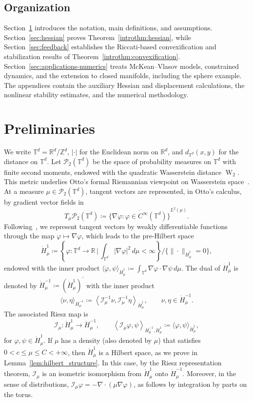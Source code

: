\documentclass[11pt]{article}
\numberwithin{equation}{section}
\theoremstyle{definition}
\newcommand{\R}{\mathbb{R}}
\newcommand{\T}{\mathbb{T}}
\newcommand{\Pcal}{\mathcal{P}}
\newcommand{\Wtwo}{\operatorname{W}_2}
\newcommand{\potential}[1][\mu]{\dot{H}^1_{#1}}
\newcommand{\dualspace}[1][\mu]{\dot{H}^{-1}_{#1}}
\newcommand{\rieszmap}[1][\mu]{\mathcal{I}_{#1}}
\begin{document}
\subsection{Organization}

Section~\ref{sec:setting} introduces the notation, main definitions, and assumptions.
Section~\ref{sec:hessian} proves Theorem~\ref{introthm:hessian}, while Section~\ref{sec:feedback} establishes the Riccati-based convexification and stabilization results of Theorem~\ref{introthm:convexification}.
Section~\ref{sec:applications-numerics} treats McKean--Vlasov models, constrained dynamics, and the extension to closed manifolds, including the sphere example.
The appendices contain the auxiliary Hessian and displacement calculations, the nonlinear stability estimates, and the numerical methodology.

\section{Preliminaries}
\label{sec:setting}

We write $\T^d = \R^d/\mathbb{Z}^d$, $|\cdot|$ for the Euclidean norm on $\R^d$, and $d_{\T^d}(x,y)$ for the distance on $\T^d$.
Let $\Pcal_2(\T^d)$ be the space of probability measures on $\T^d$ with finite second moments, endowed with the quadratic Wasserstein distance $\Wtwo$.
This metric underlies Otto's formal Riemannian viewpoint on Wasserstein space~\cite{Otto2001,AmbrosioGigliSavare2008}.
At a measure $\mu \in \Pcal_2(\T^d)$, tangent vectors are represented, in Otto's calculus, by gradient vector fields in
\[
T_\mu\Pcal_2(\T^d) \coloneqq \overline{\{\nabla\varphi : \varphi\in C^\infty(\T^d)\}}^{L^2(\mu)}.
\]
Following~\cite{denzler2005fast}, we represent tangent vectors by weakly differentiable functions through the map $\varphi \mapsto \nabla\varphi$, which leads to the pre-Hilbert space
\[
\potential \coloneqq \left\{ \varphi : \T^d \to \R \, \Big| \, \int_{\T^d} |\nabla\varphi|^2 \, d\mu < \infty\right\} \big/ \{\|\cdot\|_{\potential} = 0\},
\]
endowed with the inner product $\langle \varphi, \psi \rangle_{\potential} \coloneqq \int_{\T^d} \nabla\varphi \cdot \nabla\psi \, d\mu$.
The dual of $\potential$ is denoted by $\dualspace \coloneqq (\potential)^\prime$ with the inner product
\[
\langle \nu, \eta \rangle_{\dualspace} \coloneqq \left\langle \rieszmap[\mu]^{-1}\nu, \rieszmap[\mu]^{-1}\eta \right\rangle_{\potential}, \qquad \nu, \eta \in \dualspace.
\]
The associated Riesz map is
\[
\rieszmap : \potential \to \dualspace, \qquad
\left\langle \rieszmap \varphi, \psi\right\rangle_{\dualspace,\potential} \coloneqq \langle \varphi, \psi \rangle_{\potential},
\]
for $\varphi, \psi \in \potential$.
If $\mu$ has a density (also denoted by $\mu$) that satisfies $0 < c \le \mu \le C < +\infty$, then $\potential$ is a Hilbert space, as we prove in Lemma~\ref{lem:hilbert_structure}.
In this case, by the Riesz representation theorem, $\rieszmap$ is an isometric isomorphism from $\potential$ onto $\dualspace$.
Moreover, in the sense of distributions, $\rieszmap \varphi = -\nabla\cdot(\mu \nabla\varphi)$, as follows by integration by parts on the torus.
\end{document}
